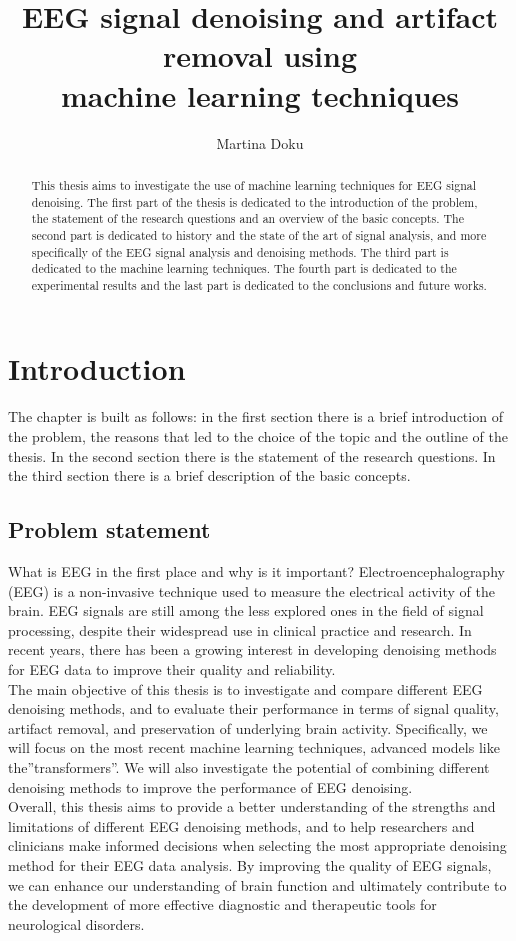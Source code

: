 \documentclass[a4paper]{sapthesis}
\title{EEG signal denoising and artifact removal using \\ machine learning techniques}
\author{Martina Doku}
\begin{document}
\maketitle
\dedication{dedication}
\begin{abstract}
This thesis aims to investigate the use of machine learning
 techniques for EEG signal denoising. The first part of the
thesis is dedicated to the introduction of the problem, the statement
of the research questions and an overview of the basic concepts.
The second part is dedicated to history and 
the state of
the art of signal analysis, and more specifically of the EEG signal
analysis and denoising methods. The third part is dedicated to the
 machine learning techniques.
The fourth part is dedicated to the experimental results and the last part
is dedicated to the conclusions and future works.
\end{abstract}
\tableofcontents
\chapter{Introduction}
The chapter is built as follows: in the first section there is a brief
introduction of the problem, the reasons that led to the choice of the
topic and the outline of the thesis. In the second section there is the
statement of the research questions. In the third section there is a brief
description of the basic concepts.
\section{Problem statement}
What is EEG in the first place and why is it important? Electroencephalography 
(EEG) is a non-invasive technique used to measure the electrical activity of
the brain. EEG signals are still among the less explored ones in the
field of signal processing, despite their widespread use in clinical 
practice and research. In recent years, there has been a growing 
interest in developing denoising methods for EEG data to improve their 
quality and reliability.\newline \\
The main objective of this thesis is to investigate and compare different
 EEG denoising methods, and to evaluate their performance in terms of 
 signal quality, artifact removal, and preservation of underlying brain
activity. Specifically, we will focus on the most recent machine learning
techniques, advanced models like the''transformers''. We will also investigate the 
potential of combining different denoising methods to improve the 
performance of EEG denoising.\newline \\
Overall, this thesis aims to provide a better understanding of the strengths
 and limitations of different EEG denoising methods, and to help researchers
  and clinicians make informed decisions when selecting the most appropriate
   denoising method for their EEG data analysis. By improving the quality of
    EEG signals, we can enhance our understanding of brain function and 
    ultimately contribute to the development of more effective diagnostic 
    and therapeutic tools for neurological disorders.
\end{document}
